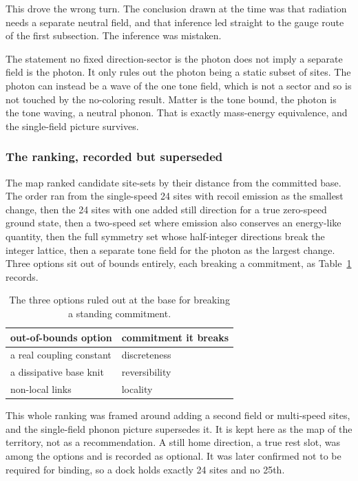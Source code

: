 This drove the wrong turn. The conclusion drawn at the time was that radiation needs a separate neutral field, and that inference led straight to the gauge route of the first subsection. The inference was mistaken.

\begin{result}
The statement no fixed direction-sector is the photon does not imply a separate field is the photon. It only rules out the photon being a static subset of sites. The photon can instead be a wave of the one tone field, which is not a sector and so is not touched by the no-coloring result. Matter is the tone bound, the photon is the tone waving, a neutral phonon. That is exactly mass-energy equivalence, and the single-field picture survives.
\end{result}

\subsubsection{The ranking, recorded but superseded}

The map ranked candidate site-sets by their distance from the committed base. The order ran from the single-speed 24 sites with recoil emission as the smallest change, then the 24 sites with one added still direction for a true zero-speed ground state, then a two-speed set where emission also conserves an energy-like quantity, then the full symmetry set whose half-integer directions break the integer lattice, then a separate tone field for the photon as the largest change. Three options sit out of bounds entirely, each breaking a commitment, as Table~\ref{tab:out-of-bounds} records.

\begin{table}[ht]
\centering
\begin{tabular}{@{}ll@{}}
\toprule
out-of-bounds option & commitment it breaks \\
\midrule
a real coupling constant & discreteness \\
a dissipative base knit & reversibility \\
non-local links & locality \\
\bottomrule
\end{tabular}
\caption{The three options ruled out at the base for breaking a standing commitment.}
\label{tab:out-of-bounds}
\end{table}

This whole ranking was framed around adding a second field or multi-speed sites, and the single-field phonon picture supersedes it. It is kept here as the map of the territory, not as a recommendation. A still home direction, a true rest slot, was among the options and is recorded as optional. It was later confirmed not to be required for binding, so a dock holds exactly 24 sites and no 25th.

